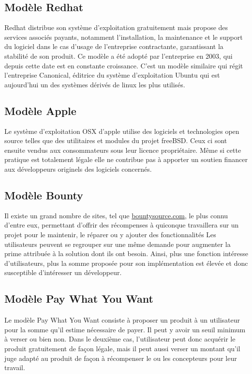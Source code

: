     \subsection{Modèle Redhat}

Redhat distribue son système d'exploitation gratuitement mais propose des 
services associés payants, notamment l'installation, la maintenance et le 
support du logiciel dans le cas d'usage de l'entreprise contractante, 
garantissant la stabilité de son produit.
Ce modèle a été adopté par l'entreprise en 2003, qui depuis cette date est en 
constante croissance.
C'est un modèle similaire qui régit l'entreprise Canonical, éditrice du 
système d'exploitation Ubuntu qui est aujourd'hui un des systèmes dérivés de 
linux les plus utilisés.

    \subsection{Modèle Apple}

Le système d'exploitation OSX d'apple utilise des logiciels et technologies 
open source telles que des utilitaires et modules du projet freeBSD\@.
Ceux ci sont ensuite vendus aux consommateurs sous leur licence propriétaire. 
Même si cette pratique est totalement légale elle ne contribue pas à apporter 
un soutien financer aux développeurs originels des logiciels concernés.

    \subsection{Modèle Bounty}

Il existe un grand nombre de sites, tel que \url{bountysource.com}, le 
plus connu d'entre eux, permettant d'offrir des récompenses à quiconque 
travaillera sur un projet pour le maintenir, le réparer ou y ajouter des 
fonctionnalités
Les utilisateurs peuvent se regrouper sur une même demande pour augmenter la 
prime attribuée à la solution dont ils ont besoin.
Ainsi, plus une fonction intéresse d'utilisateurs, plus la somme proposée pour 
son implémentation est élevée et donc susceptible d'intéresser un développeur.

    \subsection{Modèle Pay What You Want}

    \paragraph{} Le modèle Pay What You Want consiste à proposer un produit à
    un utilisateur pour la somme qu'il estime nécessaire de payer. Il peut y
    avoir un seuil minimum à verser ou bien non. Dans le deuxième cas,
    l'utilisateur peut donc acquérir le produit gratuitement de façon légale,
    mais il peut aussi verser un montant qu'il juge adapté au produit de façon
    à récompenser le ou les concepteurs pour leur travail.

